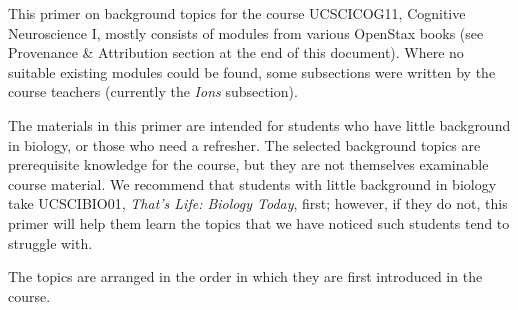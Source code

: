 
This primer on background topics for the course UCSCICOG11,
Cognitive Neuroscience I, mostly consists of modules from various
OpenStax books (see Provenance \& Attribution section at the end of
this document). Where no suitable existing modules could be found, some
subsections were written by the course teachers (currently the
\textit{Ions} subsection).

The materials in this primer are intended for students who have
little background in biology, or those who need a refresher. The
selected background topics are prerequisite knowledge for the course,
but they are not themselves examinable course material. We recommend
that students with little background in biology take UCSCIBIO01,
\textit{That's Life: Biology Today}, first; however, if they do not,
this primer will help them learn the topics that we have noticed such
students tend to struggle with.

The topics are arranged in the order in which they are first introduced
in the course.

